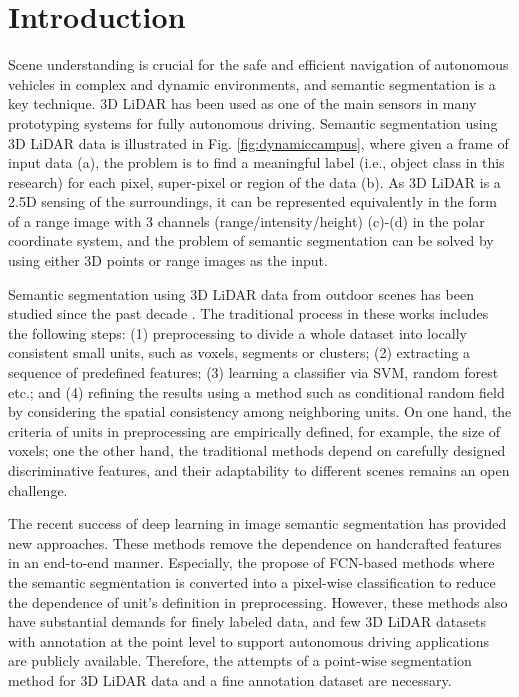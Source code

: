 \section{Introduction}
Scene understanding is crucial for the safe and efficient navigation of autonomous vehicles in complex and dynamic environments, and semantic segmentation is a key technique. 3D LiDAR has been used as one of the main sensors in many prototyping systems for fully autonomous driving\cite{urmson2008autonomous}. Semantic segmentation using 3D LiDAR data is illustrated in Fig. \ref{fig:dynamiccampus}, where given a frame of input data (a), the problem is to find a meaningful label (i.e., object class in this research) for each pixel, super-pixel or region of the data (b). As 3D LiDAR is a 2.5D sensing of the surroundings, it can be represented equivalently in the form of a range image with 3 channels (range/intensity/height) (c)-(d) in the polar coordinate system, and the problem of semantic segmentation can be solved by using either 3D points or range images as the input.

Semantic segmentation using 3D LiDAR data from outdoor scenes has been studied since the past decade \cite{urmson2008autonomous,moosmann2009segmentation,douillard2011segmentation}. The traditional process in these works \cite{munoz2009onboard,zhao2010scene} includes the following steps: (1) preprocessing to divide a whole dataset into locally consistent small units, such as voxels, segments or clusters; (2) extracting a sequence of predefined features; (3) learning a classifier via SVM, random forest etc.; and (4) refining the results using a method such as conditional random field by considering the spatial consistency among neighboring units. On one hand, the criteria of units in preprocessing are empirically defined, for example, the size of voxels\cite{hackel2017isprs}; one the other hand, the traditional methods depend on carefully designed discriminative features, and their adaptability to different scenes remains an open challenge.

The recent success of deep learning in image semantic segmentation has provided new approaches\cite{garcia2017review}. These methods remove the dependence on handcrafted features in an end-to-end manner. Especially, the propose of FCN-based methods\cite{long2015fully} where the semantic segmentation is converted into a pixel-wise classification to reduce the dependence of unit's definition in preprocessing. However, these methods also have substantial demands for finely labeled data\cite{garcia2017review}, and few 3D LiDAR datasets with annotation at the point level to support autonomous driving applications are publicly available. Therefore, the attempts of a point-wise segmentation method for 3D LiDAR data and a fine annotation dataset are necessary.

